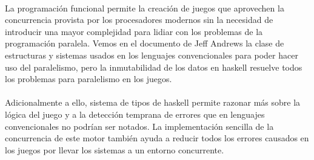 \documentclass{standalone}
\begin{document}
\paragraph{}
La programación funcional permite la creación de juegos que aprovechen la concurrencia provista por los procesadores modernos sin la necesidad de introducir una mayor complejidad para lidiar con los problemas de la programación paralela. Vemos en el documento de Jeff Andrews \cite{andrews2009designing} la clase de estructuras y sistemas usados en los lenguajes convencionales para poder hacer uso del paralelismo, pero la inmutabilidad de los datos en haskell resuelve todos los problemas para paralelismo en los juegos.

\paragraph{}
Adicionalmente a ello, sistema de tipos de haskell permite razonar más sobre la lógica del juego y a la detección temprana de errores que en lenguajes convencionales no podrían ser notados. La implementación sencilla de la concurrencia de este motor también ayuda a reducir todos los errores causados en los juegos por llevar los sistemas a un entorno concurrente.
\end{document}
